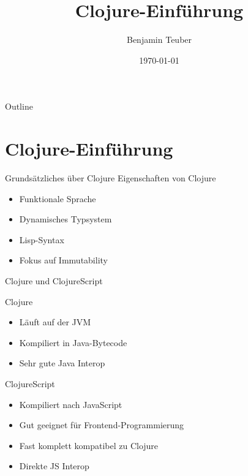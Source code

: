 \documentclass[presentation]{beamer}
\author{Benjamin Teuber}
\date{\today}
\title{Clojure-Einführung}
\institute{\cpp{}-Meetup Hamburg}
\begin{document}
\maketitle
\begin{frame}{Outline}
\tableofcontents
\end{frame}



\section{Clojure-Einführung}

\begin{frame}{Grundsätzliches über Clojure}
  Eigenschaften von Clojure
  \begin{itemize}
  \item Funktionale Sprache
  \item Dynamisches Typsystem
  \item Lisp-Syntax
  \item Fokus auf Immutability
  \end{itemize}
\end{frame}

\begin{frame}{Clojure und ClojureScript}
  \begin{block}{Clojure}
    \begin{itemize}
    \item Läuft auf der JVM
    \item Kompiliert in Java-Bytecode
    \item Sehr gute Java Interop
    \end{itemize}
  \end{block}

  \begin{block}{ClojureScript}
    \begin{itemize}
    \item Kompiliert nach JavaScript
    \item Gut geeignet für Frontend-Programmierung
    \item Fast komplett kompatibel zu Clojure
    \item Direkte JS Interop
    \end{itemize}
  \end{block}
\end{frame}
\end{document}
